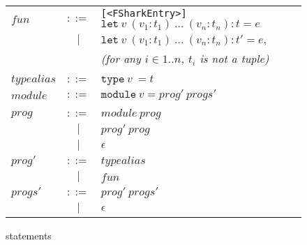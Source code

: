 \begin{figure}
  \centering
  \begin{tabular}{lclr}
    $fun$ & $::=$ & \texttt{[<FSharkEntry>]} $\texttt{let}\ v\ (v_1 : t_1)\ \ldots\ (v_n : t_n) : t = e$ & \\
        & $|$   & $\texttt{let}\ v\ (v_1 : t_1)\ \ldots\ (v_n : t_n) : t' = e,$ & \\
        &       & \hspace{1em} \textit{(for any $i \in {1..n}$, $t_i$ is not a tuple)} \\
    \\

    $typealias$ & $::=$ & $\texttt{type}\ v\ = t $& \\
    $module$ & $::=$ & $\texttt{module}\ v = prog'\ progs'$ & \\
    \\
    $prog$ & $::=$ & $module\ prog$ & \\
           & $|$   & $prog'\ prog$  & \\
           & $|$   & $\epsilon$     & \\

    $prog'$ & $::=$ & $typealias$   & \\
            & $|$   & $fun$ & \\

    $progs'$ & $::=$ & $prog'\ progs'$   & \\
             & $|$   & $\epsilon$ & \\
  \end{tabular}
  \caption{\fshark{} statements}
\end{figure}

\clearpage

